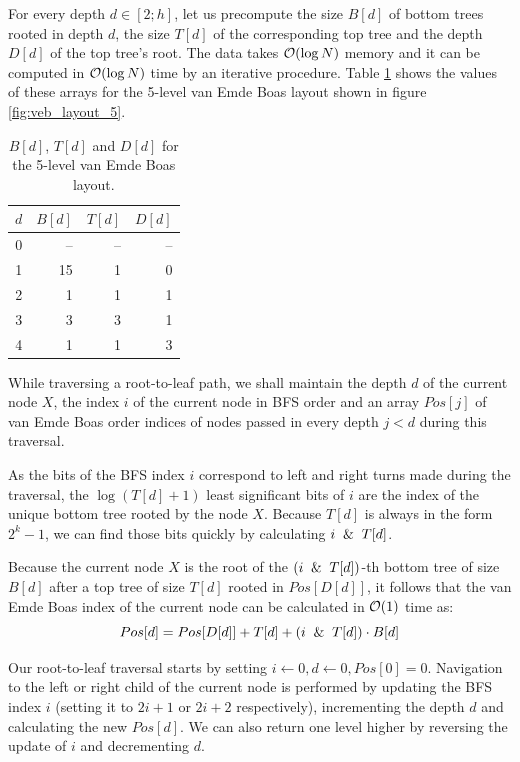 For every depth $d\in[2;h]$, let us precompute the size $B[d]$ of
bottom trees rooted in depth $d$, the size $T[d]$ of the corresponding
top tree and the depth $D[d]$ of the top tree's root. The data takes $\mathcal{O}(\log
N)$ memory and it can be computed in $\mathcal{O}(\log N)$ time by an iterative procedure.
Table \ref{tab:depth_data_example} shows the values of these arrays
for the 5-level van Emde Boas layout shown in figure \ref{fig:veb_layout_5}.

\begin{table}[h]
	\centering
	\begin{tabular}{r|r|r|r}
		$d$ & $B[d]$ & $T[d]$ & $D[d]$ \\
		\hline
		0   & --     & --     & --     \\
		1   & 15     & 1      & 0      \\
		2   & 1      & 1      & 1      \\
		3   & 3      & 3      & 1      \\
		4   & 1      & 1      & 3
	\end{tabular}
	\caption{$B[d]$, $T[d]$ and $D[d]$ for the 5-level van Emde
	Boas layout.}
	\label{tab:depth_data_example}
\end{table}

While traversing a root-to-leaf path, we shall maintain the depth
$d$ of the current node $X$, the index $i$ of the current node in BFS order
and an array $Pos[j]$ of van Emde Boas order indices of nodes passed in every
depth $j<d$ during this traversal.

As the bits of the BFS index $i$ correspond to left and right turns made during
the traversal, the $\log(T[d]+1)$ least significant bits of $i$ are the
index of the unique bottom tree rooted by the node $X$. Because $T[d]$ is
always in the form $2^k-1$, we can find those bits quickly by calculating
$i \And T[d]$.

Because the current node $X$ is the root of the $(i \And T[d])$-th
bottom tree of size $B[d]$ after a top tree of size $T[d]$ rooted in
$Pos[D[d]]$, it follows that the van Emde Boas index of the current node can be
calculated in $\mathcal{O}(1)$ time as:
$$Pos[d]=Pos[D[d]] + T[d] + (i \And T[d]) \cdot B[d]$$

Our root-to-leaf traversal starts by setting $i\gets 0, d\gets 0, Pos[0]=0$.
Navigation to the left or right child of the current node is performed
by updating the BFS index $i$ (setting it to $2i+1$ or $2i+2$ respectively),
incrementing the depth $d$ and calculating the new $Pos[d]$.
We can also return one level higher by reversing the update of $i$ and
decrementing $d$.

